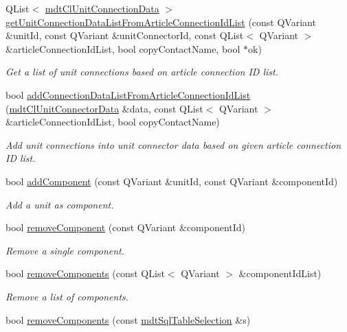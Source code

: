 \begin{DoxyCompactItemize}
Q\-List$<$ \hyperlink{classmdt_cl_unit_connection_data}{mdt\-Cl\-Unit\-Connection\-Data} $>$ \hyperlink{classmdt_cl_unit_ac593b17febfe5312230296630d61ea66}{get\-Unit\-Connection\-Data\-List\-From\-Article\-Connection\-Id\-List} (const Q\-Variant \&unit\-Id, const Q\-Variant \&unit\-Connector\-Id, const Q\-List$<$ Q\-Variant $>$ \&article\-Connection\-Id\-List, bool copy\-Contact\-Name, bool $\ast$ok)
\begin{DoxyCompactList}\small\item\em Get a list of unit connections based on article connection I\-D list. \end{DoxyCompactList}\item 
bool \hyperlink{classmdt_cl_unit_a9aa3d52f4e6d79fa003d96e04be8223e}{add\-Connection\-Data\-List\-From\-Article\-Connection\-Id\-List} (\hyperlink{classmdt_cl_unit_connector_data}{mdt\-Cl\-Unit\-Connector\-Data} \&data, const Q\-List$<$ Q\-Variant $>$ \&article\-Connection\-Id\-List, bool copy\-Contact\-Name)
\begin{DoxyCompactList}\small\item\em Add unit connections into unit connector data based on given article connection I\-D list. \end{DoxyCompactList}\item 
bool \hyperlink{classmdt_cl_unit_a2315532b648609910541e739a4217014}{add\-Component} (const Q\-Variant \&unit\-Id, const Q\-Variant \&component\-Id)
\begin{DoxyCompactList}\small\item\em Add a unit as component. \end{DoxyCompactList}\item 
bool \hyperlink{classmdt_cl_unit_aab0bc86d8ebbcd9ea1124c4e584a1fbf}{remove\-Component} (const Q\-Variant \&component\-Id)
\begin{DoxyCompactList}\small\item\em Remove a single component. \end{DoxyCompactList}\item 
bool \hyperlink{classmdt_cl_unit_a767070e07954eaf7247f26f777644f1c}{remove\-Components} (const Q\-List$<$ Q\-Variant $>$ \&component\-Id\-List)
\begin{DoxyCompactList}\small\item\em Remove a list of components. \end{DoxyCompactList}\item 
bool \hyperlink{classmdt_cl_unit_afb028e79c63e2e649c3108bab60058a3}{remove\-Components} (const \hyperlink{classmdt_sql_table_selection}{mdt\-Sql\-Table\-Selection} \&s)

\end{DoxyCompactItemize}
